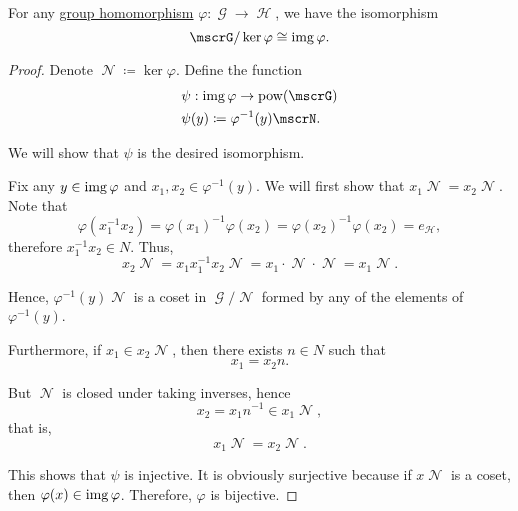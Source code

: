 \begin{theorem}\label{thm:homomorphism_theorem_for_groups}
  For any \hyperref[def:group/homomorphism]{group homomorphism} \( \varphi: \mscrG \to \mscrH \), we have the isomorphism
  \begin{equation*}
    \mscrG / \ker \varphi \cong \img \varphi.
  \end{equation*}
\end{theorem}
\begin{proof}
  Denote \( \mscrN \coloneqq \ker \varphi \). Define the function
  \begin{align*}
    &\psi: \img \varphi \to \pow(\mscrG) \\
    &\psi(y) \coloneqq \varphi^{-1}(y) \mscrN.
  \end{align*}

  We will show that \( \psi \) is the desired isomorphism.

  Fix any \( y \in \operatorname{img} \varphi \) and \( x_1, x_2 \in \varphi^{-1}(y) \). We will first show that \( x_1 \mscrN = x_2 \mscrN \). Note that
  \begin{equation*}
    \varphi(x_1^{-1} x_2)
    =
    \varphi(x_1)^{-1} \varphi(x_2)
    =
    \varphi(x_2)^{-1} \varphi(x_2)
    =
    e_{\mscrH},
  \end{equation*}
  therefore \( x_1^{-1} x_2 \in N \). Thus,
  \begin{equation*}
    x_2 \mscrN = x_1 x_1^{-1} x_2 \mscrN = x_1 \cdot \mscrN \cdot \mscrN = x_1 \mscrN.
  \end{equation*}

  Hence, \( \varphi^{-1}(y) \mscrN \) is a coset in \( \mscrG / \mscrN \) formed by any of the elements of \( \varphi^{-1}(y) \).

  Furthermore, if \( x_1 \in x_2 \mscrN \), then there exists \( n \in N \) such that
  \begin{equation*}
    x_1 = x_2 n.
  \end{equation*}

  But \( \mscrN \) is closed under taking inverses, hence
  \begin{equation*}
    x_2 = x_1 n^{-1} \in x_1 \mscrN,
  \end{equation*}
  that is,
  \begin{equation*}
    x_1 \mscrN = x_2 \mscrN.
  \end{equation*}

  This shows that \( \psi \) is injective. It is obviously surjective because if \( x \mscrN \) is a coset, then \( \varphi(x) \in \operatorname{img} \varphi \). Therefore, \( \varphi \) is bijective.


\end{proof}

